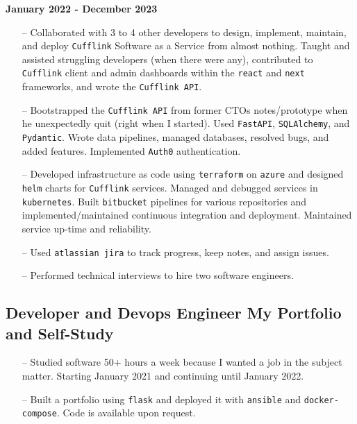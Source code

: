 \documentclass{article}
\begin{document}
\textbf{January 2022 - December 2023}

\begin{itemize}
\tightlist
\item[--]
  Collaborated with 3 to 4 other developers to design, implement, maintain,
  and deploy \texttt{Cufflink} Software as a Service from almost nothing. Taught and assisted struggling developers (when there were any), contributed to \texttt{Cufflink} client and admin dashboards within the \texttt{react} and \texttt{next} frameworks, and wrote the \texttt{Cufflink API}.
\item[--]
  Bootstrapped the \texttt{Cufflink API} from former CTOs notes/prototype when
  he unexpectedly quit (right when I started). Used \texttt{FastAPI}, \texttt{SQLAlchemy}, and \texttt{Pydantic}. Wrote data pipelines, managed databases, resolved bugs, and added features. Implemented \texttt{Auth0} authentication.
\item[--]
  Developed infrastructure as code using \texttt{terraform} on \texttt{azure} and designed \texttt{helm} charts for \texttt{Cufflink} services. Managed and debugged services in \texttt{kubernetes}. Built \texttt{bitbucket} pipelines for various repositories and implemented/maintained
  continuous integration and deployment. Maintained service up-time and reliability.
\item[--]
  Used \texttt{atlassian jira} to track progress, keep notes, and assign issues.
\item[--]
  Performed technical interviews to hire two software engineers.
\end{itemize}

\subsection*{Developer and Devops Engineer \textbar{} My Portfolio and
Self-Study}\label{developer-and-devops-engineer-my-portfolio-and-self-study}

\begin{itemize}
\tightlist
\item[--]
  Studied software 50+ hours a week because I wanted a job in the subject matter. Starting January 2021 and continuing until January
  2022.
\item[--]
  Built a portfolio using \texttt{flask} and deployed it with
  \texttt{ansible} and \texttt{docker-compose}. Code is available upon request.
\end{itemize}
\end{document}
